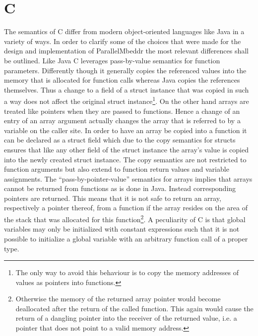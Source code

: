 \section{C}
The semantics of C differ from modern object-oriented languages like Java in a variety of ways. In order to clarify some of the choices that were made for the design and implementation of ParallelMbeddr the most relevant differences shall be outlined. Like Java C leverages pass-by-value semantics for function parameters. Differently though it generally copies the referenced values into the memory that is allocated for function calls whereas Java copies the references themselves. Thus a change to a field of a struct instance that was copied in such a way does not affect the original struct instance\footnote{The only way to avoid this behaviour is to copy the memory addresses of values as pointers into functions.}. On the other hand arrays are treated like pointers when they are passed to functions. Hence a change of an entry of an array argument actually changes the array that is referred to by a variable on the caller site. In order to have an array be copied into a function it can be declared as a struct field which due to the copy semantics for structs ensures that like any other field of the struct instance the array's value is copied into the newly created struct instance. The copy semantics are not restricted to function arguments but also extend to function return values and variable assignments. The ``pass-by-pointer-value'' semantics for arrays implies that arrays cannot be returned from functions as is done in Java. Instead corresponding pointers are returned. This means that it is not safe to return an array, respectively a pointer thereof, from a function if the array resides on the area of the stack that was allocated for this function\footnote{Otherwise the memory of the returned array pointer would become deallocated after the return of the called function. This again would cause the return of a dangling pointer into the receiver of the returned value, i.e. a pointer that does not point to a valid memory address.}. 
A peculiarity of C is that global variables may only be initialized with constant expressions such that it is not possible to initialize a global variable with an arbitrary function call of a proper type\cite[p.~48]{CForBASICProgrammers}.




